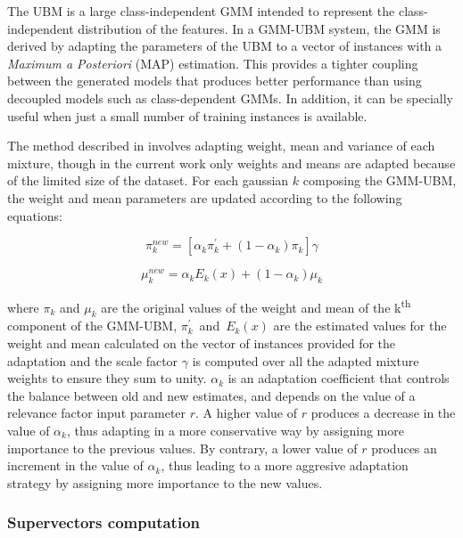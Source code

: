 The UBM is a large class-independent GMM intended to represent the class-independent distribution
of the features. In a GMM-UBM system, the GMM is derived by adapting the parameters of the UBM
to a vector of instances with a \textit{Maximum a Posteriori} (MAP) estimation. This provides a
tighter coupling between the generated models that produces better performance than using
decoupled models such as class-dependent GMMs. In addition, it can be specially useful when
just a small number of training instances is available.

The method described in \cite{ubm_adaptation} involves adapting weight, mean and variance of each
mixture, though in the current work only weights and means are adapted because of the limited
size of the dataset. For each gaussian $k$ composing the GMM-UBM, the weight and mean parameters
are updated according to the following equations:

\begin{equation}
  \pi_{k}^{new} = [\alpha_{k} \pi_{k}^{'} + (1-\alpha_{k}) \pi_{k}]\gamma
\end{equation}

\begin{equation}
  \mu_{k}^{new} = \alpha_{k} E_{k}(x) + (1-\alpha_{k})\mu_{k}
\end{equation}

where $\pi_{k}$ and $\mu_{k}$ are the original values of the weight and mean of the
k\textsuperscript{th} component of the GMM-UBM, \mbox{$\pi_{k}^{'}$ and $E_{k}(x)$} are
the estimated values for the weight and mean calculated on the vector of instances provided
for the adaptation and the scale factor $\gamma$ is computed over all the
adapted mixture weights to ensure they sum to unity. $\alpha_{k}$ is an adaptation
coefficient that controls the balance between old and new estimates, and depends on the value of
a relevance factor input parameter $r$. A higher value of $r$ produces a decrease in the value
of $\alpha_{k}$, thus adapting in a more conservative way by assigning more importance
to the previous values. By contrary, a lower value of $r$ produces an increment in the value
of $\alpha_{k}$, thus leading to a more aggresive adaptation strategy by assigning more importance
to the new values. %

\subsubsection{Supervectors computation}

